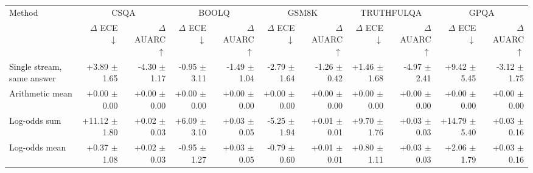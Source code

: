 \begin{tabular}{lrrrrrrrrrr}
\toprule
Method & \multicolumn{2}{c}{CSQA} & \multicolumn{2}{c}{BOOLQ} & \multicolumn{2}{c}{GSM8K} & \multicolumn{2}{c}{TRUTHFULQA} & \multicolumn{2}{c}{GPQA} \\
 & $\Delta$ ECE $\downarrow$ & $\Delta$ AUARC $\uparrow$ & $\Delta$ ECE $\downarrow$ & $\Delta$ AUARC $\uparrow$ & $\Delta$ ECE $\downarrow$ & $\Delta$ AUARC $\uparrow$ & $\Delta$ ECE $\downarrow$ & $\Delta$ AUARC $\uparrow$ & $\Delta$ ECE $\downarrow$ & $\Delta$ AUARC $\uparrow$ \\
\midrule
Single stream, same answer & +3.89 {\scriptsize $\pm$ 1.65} & -4.30 {\scriptsize $\pm$ 1.17} & -0.95 {\scriptsize $\pm$ 3.11} & -1.49 {\scriptsize $\pm$ 1.04} & -2.79 {\scriptsize $\pm$ 1.64} & -1.26 {\scriptsize $\pm$ 0.42} & +1.46 {\scriptsize $\pm$ 1.68} & -4.97 {\scriptsize $\pm$ 2.41} & +9.42 {\scriptsize $\pm$ 5.45} & -3.12 {\scriptsize $\pm$ 1.75} \\
Arithmetic mean & +0.00 {\scriptsize $\pm$ 0.00} & +0.00 {\scriptsize $\pm$ 0.00} & +0.00 {\scriptsize $\pm$ 0.00} & +0.00 {\scriptsize $\pm$ 0.00} & +0.00 {\scriptsize $\pm$ 0.00} & +0.00 {\scriptsize $\pm$ 0.00} & +0.00 {\scriptsize $\pm$ 0.00} & +0.00 {\scriptsize $\pm$ 0.00} & +0.00 {\scriptsize $\pm$ 0.00} & +0.00 {\scriptsize $\pm$ 0.00} \\
Log-odds sum & +11.12 {\scriptsize $\pm$ 1.80} & +0.02 {\scriptsize $\pm$ 0.03} & +6.09 {\scriptsize $\pm$ 3.10} & +0.03 {\scriptsize $\pm$ 0.05} & -5.25 {\scriptsize $\pm$ 1.94} & +0.01 {\scriptsize $\pm$ 0.01} & +9.70 {\scriptsize $\pm$ 1.76} & +0.03 {\scriptsize $\pm$ 0.03} & +14.79 {\scriptsize $\pm$ 5.40} & +0.03 {\scriptsize $\pm$ 0.16} \\
Log-odds mean & +0.37 {\scriptsize $\pm$ 1.08} & +0.02 {\scriptsize $\pm$ 0.03} & -0.95 {\scriptsize $\pm$ 1.27} & +0.03 {\scriptsize $\pm$ 0.05} & -0.79 {\scriptsize $\pm$ 0.60} & +0.01 {\scriptsize $\pm$ 0.01} & +0.80 {\scriptsize $\pm$ 1.11} & +0.03 {\scriptsize $\pm$ 0.03} & +2.06 {\scriptsize $\pm$ 1.79} & +0.03 {\scriptsize $\pm$ 0.16} \\

\end{tabular}
